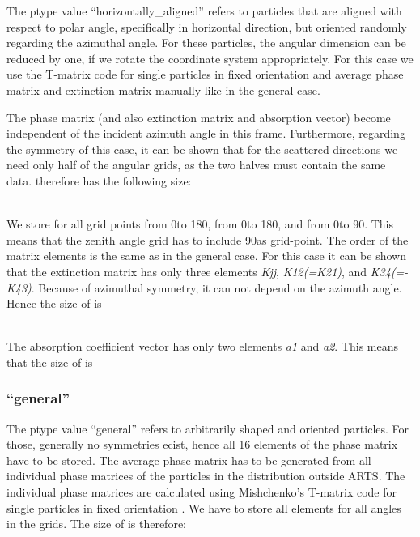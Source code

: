 The ptype value ``horizontally\_aligned'' refers to particles that are
aligned with respect to polar angle, specifically in horizontal direction, but
oriented randomly regarding the azimuthal angle. For these particles,
the angular dimension can be
reduced by one, if we rotate the coordinate system appropriately. For
this case we use the T-matrix code for single particles in fixed
orientation and average phase matrix and extinction matrix manually
like in the general case.

The phase matrix (and also extinction matrix and absorption vector)
become independent of the incident azimuth angle in this
frame. Furthermore, regarding the symmetry of this case, it can be
shown that for the scattered directions we need only half of the
angular grids, as the two halves must contain the same
data.  therefore has the following size:

\\
We store  for all grid points from 0\degree to 180\degree,
 from 0\degree to 
180\degree, and  from 0\degree to 90\degree. This means that the
zenith angle grid 
has to include 90\degree as grid-point. The order of the matrix elements is
the same as in the general case. For this case it can be shown that the extinction matrix has only
three elements {\sl Kjj}, {\sl K12(=K21)}, and {\sl K34(=-K43)}. 
Because of azimuthal symmetry, it can not depend on the azimuth
angle. Hence the size of  is 

\shortcode{[N\_f N\_T N\_za/2+1 1 3]}\\
The absorption coefficient vector has only two elements {\sl a1} and
{\sl a2}. This means that the size of  is 

\shortcode{[N\_f N\_T N\_za/2+1 1 2]}

\subsubsection{``general''}

The ptype value ``general'' refers to arbitrarily shaped and oriented particles.
For those, generally no symmetries ecist, hence all 16 elements of
the phase matrix have to be stored. The average phase matrix has to be generated from
all individual phase matrices of the particles in the distribution
outside ARTS. The individual phase matrices are calculated using
Mishchenko's T-matrix code for single particles in fixed orientation
\citep{Mishchenko:00}. 
We have to store all elements for all angles in the grids. The size of
 is therefore: 

